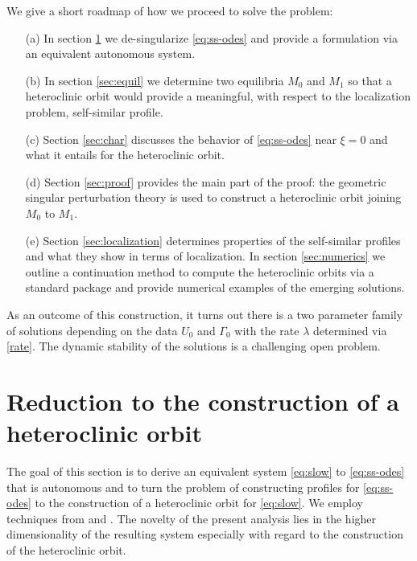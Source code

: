 \documentclass[usletter,11pt]{article}
\theoremstyle{remark}
\begin{document}
We give a short roadmap of how we proceed to solve the problem:
\begin{itemize}
\item[(a)]
In section \ref{sec:formulation} we de-singularize \eqref{eq:ss-odes} and provide a formulation via an equivalent autonomous system.
\item[(b)]
In section \ref{sec:equil} we determine two equilibria $M_0$ and $M_1$ so that a heteroclinic orbit would provide a meaningful, with respect to the
localization problem, self-similar profile.
\item[(c)]
Section \ref{sec:char} discusses the behavior of \eqref{eq:ss-odes} near $\xi = 0$ and what it entails for the heteroclinic orbit.
\item[(d)]
Section \ref{sec:proof} provides the main part of the proof: the geometric singular perturbation theory is used to construct a heteroclinic
orbit joining $M_0$ to $M_1$.
\item[(e)] Section \ref{sec:localization} determines properties of the self-similar profiles and what they show in terms of localization.
In section \ref{sec:numerics} we outline  a continuation method to compute the heteroclinic orbits via a standard package and provide 
numerical examples of the emerging solutions.
\end{itemize}
As an outcome of this construction, it turns out  there is a two parameter family of solutions depending on the data $U_0$ and $\Gamma_0$ with the rate $\lambda$ determined via \eqref{rate}.
The dynamic stability of the solutions is a challenging open problem.


\section{Reduction to the construction of a heteroclinic orbit} \label{sec:formulation}
The goal of this section is to derive an equivalent system \eqref{eq:slow} to \eqref{eq:ss-odes} that is autonomous and to turn the problem of
constructing profiles for \eqref{eq:ss-odes} to the construction of a heteroclinic orbit for \eqref{eq:slow}. We employ techniques from \cite{KOT14} and \cite{LT16}.
The novelty of the present analysis lies in the higher dimensionality of the resulting system especially  with regard to the construction of the heteroclinic orbit.
\end{document}
